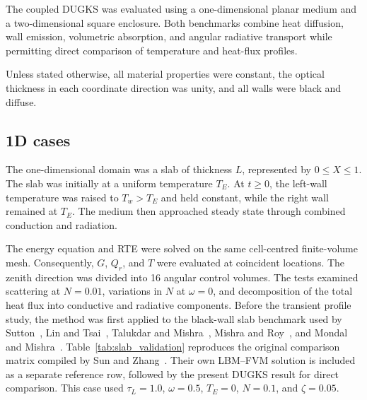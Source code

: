\documentclass[a4paper,12pt]{ctexart}
\numberwithin{equation}{section}
\begin{document}
The coupled DUGKS was evaluated using a one-dimensional planar medium and a two-dimensional square enclosure. Both benchmarks combine heat diffusion, wall emission, volumetric absorption, and angular radiative transport while permitting direct comparison of temperature and heat-flux profiles.

Unless stated otherwise, all material properties were constant, the optical thickness in each coordinate direction was unity, and all walls were black and diffuse.

\subsection{1D cases}
\label{subsec:1d_cases}

The one-dimensional domain was a slab of thickness $L$, represented by $0\leq X\leq 1$. The slab was initially at a uniform temperature $T_E$. At $t\geq0$, the left-wall temperature was raised to $T_w>T_E$ and held constant, while the right wall remained at $T_E$. The medium then approached steady state through combined conduction and radiation.

The energy equation and RTE were solved on the same cell-centred finite-volume mesh. Consequently, $G$, $Q_r$, and $T$ were evaluated at coincident locations. The zenith direction was divided into 16 angular control volumes. The tests examined scattering at $N=0.01$, variations in $N$ at $\omega=0$, and decomposition of the total heat flux into conductive and radiative components. Before the transient profile study, the method was first applied to the black-wall slab benchmark used by Sutton~\cite{Sutton1986}, Lin and Tsai~\cite{LinTsai1990}, Talukdar and Mishra~\cite{Talukdar2001}, Mishra and Roy~\cite{MishraRoy2007}, and Mondal and Mishra~\cite{MondalMishra2007}. Table~\ref{tab:slab_validation} reproduces the original comparison matrix compiled by Sun and Zhang~\cite{Sun2016}. Their own LBM--FVM solution is included as a separate reference row, followed by the present DUGKS result for direct comparison. This case used $\tau_L=1.0$, $\omega=0.5$, $T_E=0$, $N=0.1$, and $\zeta=0.05$.
\end{document}
